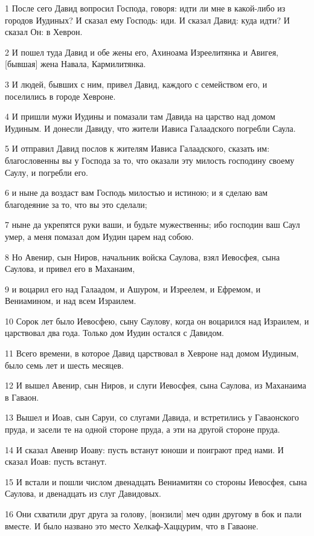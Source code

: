 \par 1 После сего Давид вопросил Господа, говоря: идти ли мне в какой-либо из городов Иудиных? И сказал ему Господь: иди. И сказал Давид: куда идти? И сказал Он: в Хеврон.
\par 2 И пошел туда Давид и обе жены его, Ахиноама Изреелитянка и Авигея, [бывшая] жена Навала, Кармилитянка.
\par 3 И людей, бывших с ним, привел Давид, каждого с семейством его, и поселились в городе Хевроне.
\par 4 И пришли мужи Иудины и помазали там Давида на царство над домом Иудиным. И донесли Давиду, что жители Иависа Галаадского погребли Саула.
\par 5 И отправил Давид послов к жителям Иависа Галаадского, сказать им: благословенны вы у Господа за то, что оказали эту милость господину своему Саулу, и погребли его.
\par 6 и ныне да воздаст вам Господь милостью и истиною; и я сделаю вам благодеяние за то, что вы это сделали;
\par 7 ныне да укрепятся руки ваши, и будьте мужественны; ибо господин ваш Саул умер, а меня помазал дом Иудин царем над собою.
\par 8 Но Авенир, сын Ниров, начальник войска Саулова, взял Иевосфея, сына Саулова, и привел его в Маханаим,
\par 9 и воцарил его над Галаадом, и Ашуром, и Изреелем, и Ефремом, и Вениамином, и над всем Израилем.
\par 10 Сорок лет было Иевосфею, сыну Саулову, когда он воцарился над Израилем, и царствовал два года. Только дом Иудин остался с Давидом.
\par 11 Всего времени, в которое Давид царствовал в Хевроне над домом Иудиным, было семь лет и шесть месяцев.
\par 12 И вышел Авенир, сын Ниров, и слуги Иевосфея, сына Саулова, из Маханаима в Гаваон.
\par 13 Вышел и Иоав, сын Саруи, со слугами Давида, и встретились у Гаваонского пруда, и засели те на одной стороне пруда, а эти на другой стороне пруда.
\par 14 И сказал Авенир Иоаву: пусть встанут юноши и поиграют пред нами. И сказал Иоав: пусть встанут.
\par 15 И встали и пошли числом двенадцать Вениамитян со стороны Иевосфея, сына Саулова, и двенадцать из слуг Давидовых.
\par 16 Они схватили друг друга за голову, [вонзили] меч один другому в бок и пали вместе. И было названо это место Хелкаф-Хаццурим, что в Гаваоне.
